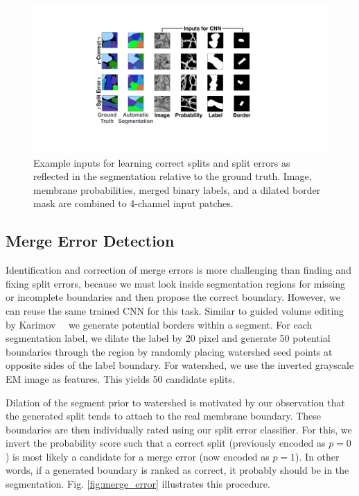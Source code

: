 \begin{figure}[h]
\begin{center}
  \includegraphics[width=\linewidth]{gfx/cnn_inputs.pdf}
\end{center}
   \caption{Example inputs for learning correct splits and split errors as reflected in the segmentation relative to the ground truth. Image, membrane probabilities, merged binary labels, and a dilated border mask are combined to 4-channel input patches.}
\label{fig:cnn_inputs}
\end{figure}


\subsection{Merge Error Detection}

Identification and correction of merge errors is more challenging than finding and fixing split errors, because we must look inside segmentation regions for missing or incomplete boundaries and then propose the correct boundary. However, we can reuse the same trained CNN for this task. Similar to guided volume editing by Karimov~\etal~\cite{karimov_guided_volume_editing} we generate potential borders within a segment. For each segmentation label, we dilate the label by 20 pixel and generate 50 potential boundaries through the region by randomly placing watershed seed points at opposite sides of the label boundary. For watershed, we use the inverted grayscale EM image as features. This yields 50 candidate splits. 

Dilation of the segment prior to watershed is motivated by our observation that the generated split tends to attach to the real membrane boundary. These boundaries are then individually rated using our split error classifier. For this, we invert the probability score such that a correct split (previously encoded as $p=0$) is most likely a candidate for a merge error (now encoded as $p=1$). In other words, if a generated boundary is ranked as correct, it probably should be in the segmentation. Fig. \ref{fig:merge_error} illustrates this procedure.

